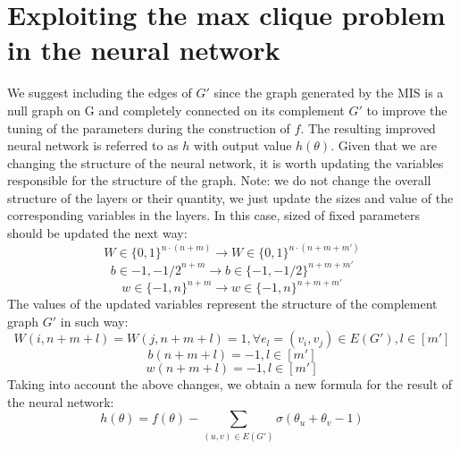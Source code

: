  
\section{Exploiting the max clique problem in the neural network}
 
 We suggest including the edges of $G'$ since the graph generated by the MIS is a null graph on G and completely connected on its complement $G'$ to improve the tuning of the parameters during the construction of $f$. The resulting improved neural network is referred to as $h$ with output value $h(\theta)$. Given that we are changing the structure of the neural network, it is worth updating the variables responsible for the structure of the graph. Note: we do not change the overall structure of the layers or their quantity, we just update the sizes and value of the corresponding variables in the layers. In this case, sized of fixed parameters should be updated the next way: 
\begin{equation}
    W \in \{0,1\}^{n\cdot (n+m)} \longrightarrow W \in \{0,1\}^{n\cdot(n+m+m')}
\end{equation}
\begin{equation}
    b \in {-1,-1/2}^{n+m} \longrightarrow b \in \{-1,-1/2\}^{n+m+m'}
\end{equation}
\begin{equation}
    w \in \{-1,n\}^{n+m} \longrightarrow w \in \{-1,n\}^{n+m+m'}
\end{equation}
The values of the updated variables represent the structure of the complement graph $G'$ in such way:
\begin{equation}\label{W}
    W(i, n+m+l) = W(j,n+m+l)=1,\forall e_l=(v_i,v_j) \in E(G'),l\in[m']
\end{equation}
\begin{equation}\label{b}
    b(n+m+l)=-1,l\in [m']
\end{equation}
\begin{equation}\label{w}
    w(n+m+l)=-1,l\in[m']
\end{equation}
Taking into account the above changes, we obtain a new formula for the result of the neural network:
\begin{equation}
    h(\theta) = f(\theta) - \sum_{(u,v)\in E(G')} \sigma(\theta_u +\theta_v - 1)
\end{equation}

